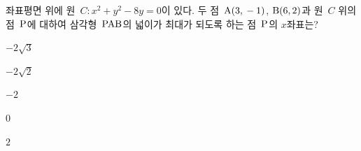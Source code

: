 좌표평면 위에 원~$C: x^2+y^2-8y=0$이 있다. 두 점~$\mathrm{A}(3{,}\mkern3mu -1)$, $\mathrm{B}(6{,}\mkern3mu 2)$과 원~$C$ 위의 점~$\mathrm{P}$에 대하여 삼각형~$\mathrm{PAB}$의 넓이가 최대가 되도록 하는 점~$\mathrm{P}$의 $x$좌표는?
\begin{choices32}{\rule[-3ex]{0pt}{8ex}$-2\sqrt{3}$}{\rule[-3ex]{0pt}{8ex}$-2\sqrt{2}$}{\rule[-3ex]{0pt}{8ex}$-2$}{\rule[-3ex]{0pt}{8ex}$0$}{\rule[-3ex]{0pt}{8ex}$2$}\end{choices32}
